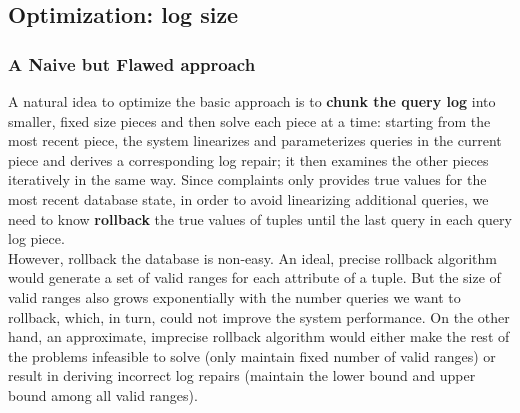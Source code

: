 


\subsection{Optimization: log size}


\subsubsection{A Naive but Flawed approach}
A natural idea to optimize the basic approach is 
to \textbf{chunk the query log} into
smaller, fixed size pieces and then solve each piece at a time: starting
from the most recent piece, the system linearizes and parameterizes queries 
in the current piece and derives a corresponding log repair; 
it then examines the other pieces iteratively
in the same way. Since complaints only provides
true values for the most recent database state, in order to avoid 
linearizing additional queries, 
we need to know \textbf{rollback} the true values of tuples 
until the last query in each query log piece. \\
However, rollback the database is non-easy. An ideal, precise rollback
algorithm would generate a set of valid ranges for each attribute of a tuple. 
But the size of valid ranges also grows exponentially with the number queries
we want to rollback, which, in turn, could not improve the system performance. 
On the other hand, an approximate, imprecise 
rollback algorithm would either make the rest of the problems
infeasible to solve (only maintain fixed number of valid ranges) 
or result in deriving 
incorrect log repairs (maintain the lower 
bound and upper bound among all valid ranges).
  

